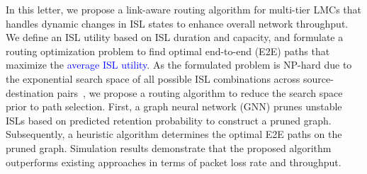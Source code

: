 In this letter, we propose a link-aware routing algorithm for multi-tier LMCs that handles dynamic changes in ISL states to enhance overall network throughput. We define an ISL utility based on ISL duration and capacity, and formulate a routing optimization problem to find optimal end-to-end (E2E) paths that maximize the \textcolor{blue}{average ISL utility}. As the formulated problem is NP-hard due to the exponential search space of all possible ISL combinations across source-destination pairs~\cite{guo2024lightweight}, we propose a routing algorithm to reduce the search space prior to path selection.
First, a graph neural network (GNN) prunes unstable ISLs based on predicted retention probability to construct a pruned graph. Subsequently, a heuristic algorithm determines the optimal E2E paths on the pruned graph. Simulation results demonstrate that the proposed algorithm outperforms existing approaches in terms of packet loss rate and throughput.
